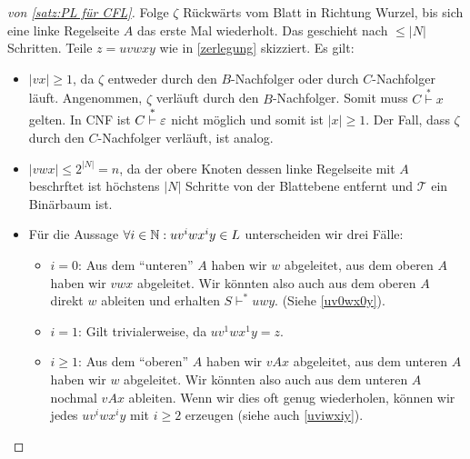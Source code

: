 \begin{proof}[von \autoref{satz:PL für CFL}]
  Folge $\zeta$ Rückwärts vom Blatt in Richtung Wurzel, bis sich eine linke Regelseite $A$ das erste Mal wiederholt. 
  Das geschieht nach $\le |N|$ Schritten.
  Teile $z = uvwxy$ wie in \autoref{zerlegung} skizziert. Es gilt:
      \begin{itemize}
      \item $|vx|\geq 1$, da $\zeta$ entweder durch den $B$-Nachfolger oder durch $C$-Nachfolger läuft.
        Angenommen, $\zeta$ verläuft durch den $B$-Nachfolger.
        Somit muss $C \stackrel{*}{\vdash} x$ gelten. In \ac{CNF} ist $C \stackrel{*}{\vdash} \varepsilon$ nicht möglich und somit ist $|x| \ge 1$.
        Der Fall, dass $\zeta$ durch den $C$-Nachfolger verläuft, ist analog.
      \item $|vwx| \le 2^{|N|} = n$, da der obere Knoten dessen linke Regelseite mit $A$ beschrftet ist höchstens $|N|$ Schritte von der Blattebene entfernt und $\mathcal{T}$ ein Binärbaum ist.
      \item Für die Aussage $\forall i\in\mathbb{N}: uv^iwx^iy\in L$ unterscheiden wir drei Fälle:
      \begin{itemize}
				\item $i=0$: Aus dem "`unteren"' $A$ haben wir $w$ abgeleitet,
				aus dem oberen $A$ haben wir $vwx$ abgeleitet.
				Wir könnten also auch aus dem oberen $A$ direkt $w$ ableiten und erhalten $S\vdash^* uwy$.
				(Siehe \autoref{uv0wx0y}).
				\item $i=1$: Gilt trivialerweise, da $uv^1wx^1y=z$.
				\item $i\geq 1$: Aus dem "`oberen"' $A$ haben wir $vAx$ abgeleitet,
				aus dem unteren $A$ haben wir $w$ abgeleitet.
				Wir könnten also auch aus dem unteren $A$ nochmal $vAx$ ableiten.
				Wenn wir dies oft genug wiederholen, können wir jedes $uv^iwx^iy$ mit $i\geq 2$ erzeugen
				(siehe auch \autoref{uviwxiy}).
				
      \end{itemize}

      \end{itemize}
		\begin{figure}[H]\centering
		\begin{subfigure}[b]{.35\linewidth}\centering
\end{subfigure}
\end{figure}
\end{proof}
